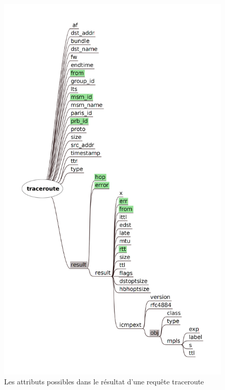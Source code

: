 \begin{figure}
\centering
\includegraphics[width=0.7\linewidth]{illustrations/traceroute_attributes}
\caption{Les attributs possibles dans le résultat d'une requête traceroute}
\label{fig:traceroute_attributes}
\end{figure}





\appendix

